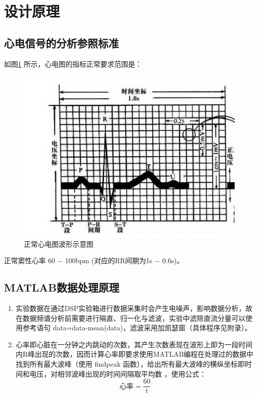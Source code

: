 \documentclass[12pt]{article}
\begin{document}
\section{设计原理}
\setcounter{table}{0}\setcounter{figure}{0}\setcounter{equation}{0}
\subsection{心电信号的分析参照标准}
如图\ref{zcxdt}
所示，心电图的指标正常要求范围是：
\begin{figure}[htbp]
  \centering
  \includegraphics[width=.7\textwidth]{21}
  \caption{正常心电图波形示意图}\label{zcxdt}
\end{figure}
正常窦性心率 60 $-$ 100bpm (对应的RR间期为1s $-$ 0.6s)。
\subsection{MATLAB数据处理原理}
\begin{enumerate}
  \item 实验数据在通过DSP实验箱进行数据采集时会产生电噪声，影响数据分析，故在数据频谱分析前需要进行隔直、归一化与滤波，实验中滤除直流分量可以使用参考语句 data=data-mean(data)，滤波采用加凯瑟窗（具体程序见附录）。
\item 心率即心脏在一分钟之内跳动的次数，其产生次数表现在波形上即为一段时间内R峰出现的次数，因而计算心率即要求使用MATLAB编程在处理过的数据中找到所有最大波峰（使用 findpeak 函数），给出所有最大波峰的横纵坐标即时间和电压，对相邻波峰出现的时间间隔取平均数 ，使用公式：
\begin{equation}
  \mbox{心率}=\frac{60}{t}
\end{equation}
\end{enumerate}
\end{document}
